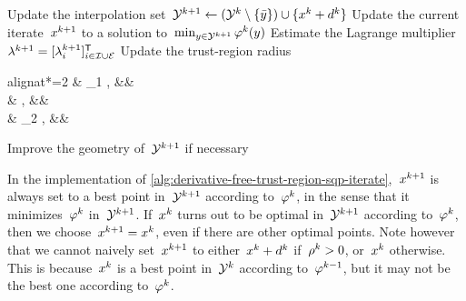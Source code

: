 \begin{algorithm}
{\begin{algomathdisplay}
        \end{algomathdisplay}
        Update the interpolation set~$\xpt[k + 1] \gets (\xpt[k] \setminus \set{\bar{y}}) \cup \set{\iter[k] + \step[k]}$\;
        Update the current iterate~$\iter[k + 1]$ to a solution to~$\min_{y \in \xpt[k + 1]} \merit[k](y)$\; 
        Estimate the Lagrange multiplier~$\lm[k + 1] = [\lm[k + 1]_i]_{i \in \iub \cup \ieq}^{\T}$\; 
        Update the trust-region radius
        \begin{algoempheq}[left={\rad[k + 1] \gets \empheqlbrace}]{alignat*=2}
            & \theta_1 \rad[k],  && \quad {}\\
            & \rad[k],           && \quad {}\\
            & \theta_2 \rad[k],  && \quad {}
        \end{algoempheq} \label{alg:derivative-free-trust-region-sqp-radius}
        Improve the geometry of~$\xpt[k + 1]$ if necessary\; \label{alg:derivative-free-trust-region-sqp-geometry}
    }
\end{algorithm}

In the implementation of \cref{alg:derivative-free-trust-region-sqp-iterate},~$\iter[k + 1]$ is always set to a best point in~$\xpt[k + 1]$ according to~$\merit[k]$, in the sense that it minimizes~$\merit[k]$ in~$\xpt[k + 1]$.
If~$\iter[k]$ turns out to be optimal in~$\xpt[k + 1]$ according to~$\merit[k]$, then we choose~$\iter[k + 1] = \iter[k]$, even if there are other optimal points.
Note however that we cannot naively set~$\iter[k + 1]$ to either~$\iter[k] + \step[k]$ if~$\ratio[k] > 0$, or~$\iter[k]$ otherwise.
This is because~$\iter[k]$ is a best point in~$\xpt[k]$ according to~$\merit[k - 1]$, but it may not be the best one according to~$\merit[k]$.


